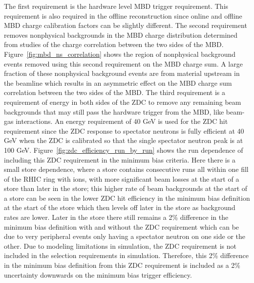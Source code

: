 The first requirement is the hardware level MBD trigger requirement. 
This requirement is also required in the offline reconstruction since online and offline MBD charge calibration factors can be slightly different.
The second requirement removes nonphysical backgrounds in the MBD charge distribution determined from studies of the charge correlation between the two sides of the MBD. 
Figure~\ref{fig:mbd_ns_correlation} shows the region of nonphysical background events removed using this second requirement on the MBD charge sum. A large fraction of these nonphysical background events are from material upstream in the beamline which results in an asymmetric effect on the MBD charge sum correlation between the two sides of the MBD. 
The third requirement is a requirement of energy in both sides of the ZDC to remove any remaining beam backgrounds that may still pass the hardware trigger from the MBD, like beam-gas interactions.
An energy requirement of 40 GeV is used for the ZDC hit requirement since the ZDC response to spectator neutrons is fully efficient at 40 GeV when the ZDC is calibrated so that the single spectator neutron peak is at 100 GeV.
Figure~\ref{fig:zdc_efficiency_run_by_run} shows the run dependence of including this ZDC requirement in the minimum bias criteria.
Here there is a small store dependence, where a store contains consecutive runs all within one fill of the RHIC ring with ions, with more significant beam losses at the start of a store than later in the store; 
this higher rate of beam backgrounds at the start of a store can be seen in the lower ZDC hit efficiency in the minimum bias definition at the start of the store which then levels off later in the store as background rates are lower. 
Later in the store there still remains a 2\% difference in the minimum bias definition with and without the ZDC requirement which can be due to very peripheral events only having a spectator neutron on one side or the other. 
Due to modeling limitations in simulation, the ZDC requirement is not included in the selection requirements in simulation.
Therefore, this 2\% difference in the minimum bias definition from this ZDC requirement is included as a 2\% uncertainty downwards on the minimum bias trigger efficiency.

